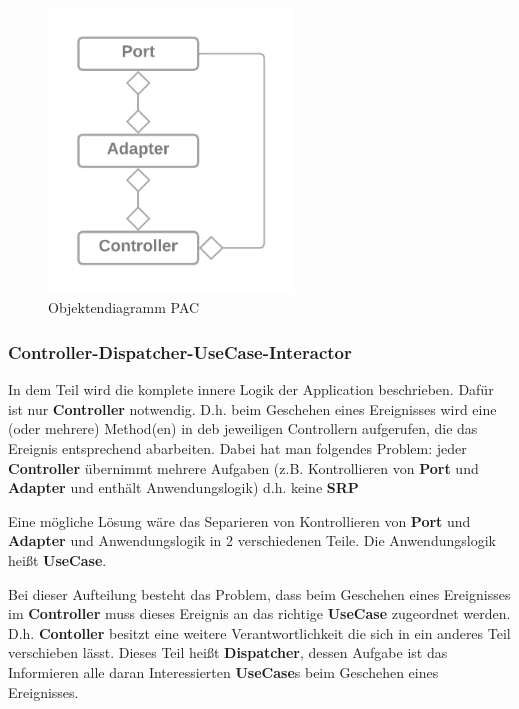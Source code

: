 \documentclass{article}
\begin{document}
    \begin{figure}[H]
       \centering
       \includegraphics[width=6.5cm]{./images/Port-Adapter-Contoller.png}
        \caption[Objektendiagramm PAC]{Objektendiagramm PAC \footnotemark}
        \label{fig:CDPAC}
    \end{figure}

    \subsubsection{Controller-Dispatcher-UseCase-Interactor} 
    \label{Controller-Dispatcher-UseCase-Interactor}
    In dem Teil wird die komplete innere Logik der Application beschrieben. Dafür ist nur \textbf{Controller} notwendig. 
    D.h. beim Geschehen eines Ereignisses wird eine (oder mehrere) Method(en) in deb jeweiligen Controllern aufgerufen,
    die das Ereignis entsprechend abarbeiten.
    Dabei hat man folgendes Problem:
    jeder \textbf{Controller} übernimmt mehrere Aufgaben 
    (z.B. Kontrollieren von \textbf{Port} und \textbf{Adapter} und enthält Anwendungslogik)
    d.h. keine \textbf{SRP}

    Eine mögliche Lösung wäre das Separieren von Kontrollieren von \textbf{Port} und \textbf{Adapter} und Anwendungslogik
    in 2 verschiedenen Teile. Die Anwendungslogik heißt \textbf{UseCase}.

    Bei dieser Aufteilung besteht das Problem, dass beim Geschehen eines Ereignisses im \textbf{Controller} muss dieses Ereignis an das 
    richtige \textbf{UseCase} zugeordnet werden. D.h. \textbf{Contoller} besitzt eine weitere Verantwortlichkeit die sich in ein anderes Teil
    verschieben lässt. Dieses Teil heißt \textbf{Dispatcher}, dessen Aufgabe ist das Informieren alle daran Interessierten \textbf{UseCase}s
    beim Geschehen eines Ereignisses. 
\end{document}
